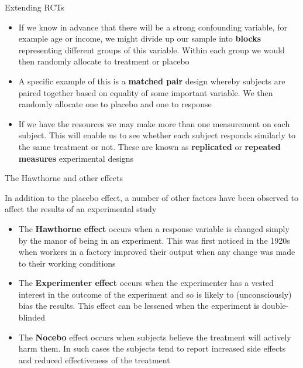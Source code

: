 \documentclass[12pt,xcolor=dvipsnames,handout,mathserif,aspectratio=169]{beamer}
\newcommand{\bbl}[1]{{\color{NavyBlue} \textbf{#1}}}
\newcommand{\bre}[1]{{\color{red} \textbf{#1}}}
\newcommand{\bgr}[1]{{\color{PineGreen} \textbf{#1}}}
\begin{document}
\begin{frame}{ Extending RCTs }

\begin{itemize}
\item If we know in advance that there will be a strong confounding variable, for example age or income, we might divide up our sample into \bbl{blocks} representing different groups of this variable. Within each group we would then randomly allocate to treatment or placebo
\pause
\item A specific example of this is a \bbl{matched pair} design whereby subjects are paired together based on equality of some important variable. We then randomly allocate one to placebo and one to response
\pause
\item If we have the resources we may make more than one measurement on each subject. This will enable us to see whether each subject responds similarly to the same treatment or not. These are known as \bbl{replicated} or \bbl{repeated measures} experimental designs
\end{itemize}

\end{frame}

\begin{frame}{The Hawthorne and other effects }

In addition to the placebo effect, a number of other factors have been observed to affect the results of an experimental study
\begin{itemize}
\item The \bbl{Hawthorne effect} occurs when a response variable is changed simply by the manor of being in an experiment. This was first noticed in the 1920s when workers in a factory improved their output when any change was made to their working conditions
\pause
\item The \bre{Experimenter effect} occurs when the experimenter has a vested interest in the outcome of the experiment and so is likely to (unconsciously) bias the results. This effect can be lessened when the experiment is double-blinded
\pause
\item The \bgr{Nocebo} effect occurs when subjects believe the treatment will actively harm them. In such cases the subjects tend to report increased side effects and reduced effectiveness of the treatment
\end{itemize}

\end{frame}
\end{document}

